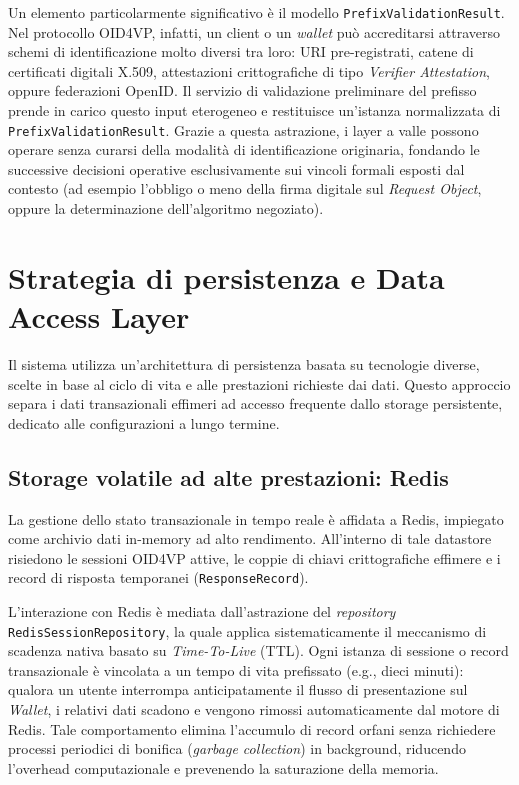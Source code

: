 Un elemento particolarmente significativo è il modello \texttt{PrefixValidationResult}. Nel protocollo OID4VP, infatti, un client o un \textit{wallet} può accreditarsi attraverso schemi di identificazione molto diversi tra loro: URI pre-registrati, catene di certificati digitali X.509, attestazioni crittografiche di tipo \textit{Verifier Attestation}, oppure federazioni OpenID. Il servizio di validazione preliminare del prefisso prende in carico questo input eterogeneo e restituisce un'istanza normalizzata di \texttt{PrefixValidationResult}. Grazie a questa astrazione, i layer a valle possono operare senza curarsi della modalità di identificazione originaria, fondando le successive decisioni operative esclusivamente sui vincoli formali esposti dal contesto (ad esempio l'obbligo o meno della firma digitale sul \textit{Request Object}, oppure la determinazione dell'algoritmo negoziato).

\section{Strategia di persistenza e Data Access Layer}
\label{sec:strategia_persistenza}
Il sistema utilizza un'architettura di persistenza basata su tecnologie diverse, scelte in base al ciclo di vita e alle prestazioni richieste dai dati. Questo approccio separa i dati transazionali effimeri ad accesso frequente dallo storage persistente, dedicato alle configurazioni a lungo termine.

\subsection{Storage volatile ad alte prestazioni: Redis}
La gestione dello stato transazionale in tempo reale è affidata a Redis, impiegato come archivio dati in-memory ad alto rendimento. All'interno di tale datastore risiedono le sessioni OID4VP attive, le coppie di chiavi crittografiche effimere e i record di risposta temporanei (\texttt{ResponseRecord}).

L'interazione con Redis è mediata dall'astrazione del \textit{repository} \texttt{RedisSessionRepository}, la quale applica sistematicamente il meccanismo di scadenza nativa basato su \textit{Time-To-Live} (TTL). Ogni istanza di sessione o record transazionale è vincolata a un tempo di vita prefissato (e.g., dieci minuti): qualora un utente interrompa anticipatamente il flusso di presentazione sul \textit{Wallet}, i relativi dati scadono e vengono rimossi automaticamente dal motore di Redis. Tale comportamento elimina l'accumulo di record orfani senza richiedere processi periodici di bonifica (\textit{garbage collection}) in background, riducendo l'overhead computazionale e prevenendo la saturazione della memoria.

